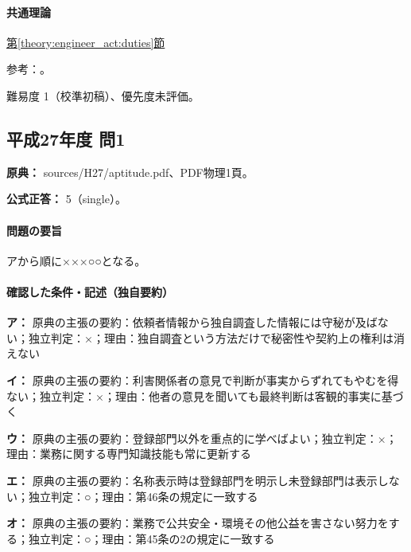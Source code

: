 \paragraph{共通理論} \hyperref[theory:engineer_act:duties]{第\ref*{theory:engineer_act:duties}節}

\par 参考：\cite{engineer_act_current}。

\par 難易度 1（校準初稿）、優先度未評価。

\subsection{平成27年度 問1}
\label{q:h27-reg-apt-01}

\noindent\textbf{原典：} sources/H27/aptitude.pdf、PDF物理1頁。

\textbf{公式正答：} 5（single）。

\paragraph{問題の要旨} アから順に×××○○となる。

\paragraph{確認した条件・記述（独自要約）}\mbox{}\par

\noindent\textbf{ア：} 原典の主張の要約：依頼者情報から独自調査した情報には守秘が及ばない；独立判定：×；理由：独自調査という方法だけで秘密性や契約上の権利は消えない\par

\noindent\textbf{イ：} 原典の主張の要約：利害関係者の意見で判断が事実からずれてもやむを得ない；独立判定：×；理由：他者の意見を聞いても最終判断は客観的事実に基づく\par

\noindent\textbf{ウ：} 原典の主張の要約：登録部門以外を重点的に学べばよい；独立判定：×；理由：業務に関する専門知識技能も常に更新する\par

\noindent\textbf{エ：} 原典の主張の要約：名称表示時は登録部門を明示し未登録部門は表示しない；独立判定：○；理由：第46条の規定に一致する\par

\noindent\textbf{オ：} 原典の主張の要約：業務で公共安全・環境その他公益を害さない努力をする；独立判定：○；理由：第45条の2の規定に一致する\par

